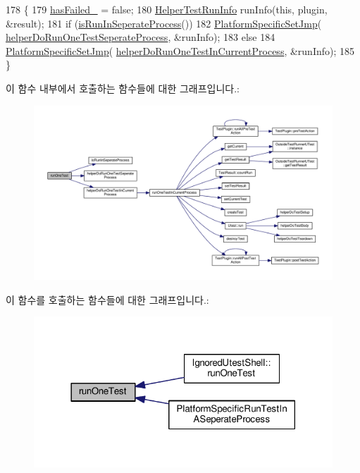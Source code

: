 \begin{DoxyCode}
178 \{
179     \hyperlink{class_utest_shell_ad1dec6e79c18c95ee078131004eb9ac2}{hasFailed\_} = \textcolor{keyword}{false};
180     \hyperlink{struct_helper_test_run_info}{HelperTestRunInfo} runInfo(\textcolor{keyword}{this}, plugin, &result);
181     \textcolor{keywordflow}{if} (\hyperlink{class_utest_shell_a24f44ff874b460e5e055050af80fb302}{isRunInSeperateProcess}())
182         \hyperlink{_platform_specific_functions__c_8h_a62b2f0c0b77d60a64cded04f9fd503a2}{PlatformSpecificSetJmp}(
      \hyperlink{_utest_8cpp_addbb1b091f7132639496400cb036b473}{helperDoRunOneTestSeperateProcess}, &runInfo);
183     \textcolor{keywordflow}{else}
184         \hyperlink{_platform_specific_functions__c_8h_a62b2f0c0b77d60a64cded04f9fd503a2}{PlatformSpecificSetJmp}(
      \hyperlink{_utest_8cpp_aeaeb69f01f4aaebc0bc8ee631cc9a5de}{helperDoRunOneTestInCurrentProcess}, &runInfo);
185 \}
\end{DoxyCode}


이 함수 내부에서 호출하는 함수들에 대한 그래프입니다.\+:
\nopagebreak
\begin{figure}[H]
\begin{center}
\leavevmode
\includegraphics[width=350pt]{class_utest_shell_a86b5bcccee3889c16117ea5cccee12b5_cgraph}
\end{center}
\end{figure}




이 함수를 호출하는 함수들에 대한 그래프입니다.\+:
\nopagebreak
\begin{figure}[H]
\begin{center}
\leavevmode
\includegraphics[width=318pt]{class_utest_shell_a86b5bcccee3889c16117ea5cccee12b5_icgraph}
\end{center}
\end{figure}


